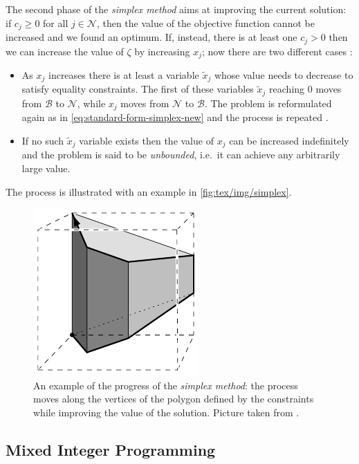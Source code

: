The second phase of the \emph{simplex method} aims at improving the current
solution: if $c_{j} \geq 0$ for all $j \in \mathcal{N} $, then the value of the
objective function cannot be increased and we found an optimum. If, instead,
there is at least one $c_{j}
	> 0$ then we can increase the value of $\zeta$ by increasing $x_{j} $; now
there are two different cases \cite{Vanderbei2008}:
\begin{itemize}
	\item As $x_{j} $ increases there is at least a variable $\tilde{x}_{j} $
	      whose value needs to decrease to satisfy equality constraints. The first
	      of these variables $\tilde{x}_{j} $ reaching $0$ moves from
	      $\mathcal{B} $ to $\mathcal{N} $, while
	      $x_{j} $ moves from $\mathcal{N} $ to $\mathcal{B} $. The problem is reformulated again as in
	      \eqref{eq:standard-form-simplex-new} and the process is repeated
	      \cite{Vanderbei2008}.
	\item If no such $\tilde{x}_{j} $ variable exists then the value of $x_{j}
	      $ can be increased indefinitely and the problem is said to be
	      \emph{unbounded}, i.e.\ it can achieve any arbitrarily large value.
\end{itemize}

The process is illustrated with an example in \autoref{fig:tex/img/simplex}.

\begin{figure}
	\centering
	\includegraphics[width=0.4\linewidth]{tex/img/simplex.png}
	\caption[Simplex method progress]{An example of the progress of the \emph{simplex method}: the
		process moves along the vertices of the polygon defined by the
		constraints while improving the value of the solution. Picture taken
		from \cite{BerndGaertner2006}.}%
	\label{fig:tex/img/simplex}
\end{figure}

\subsection{Mixed Integer Programming}%
\label{sub:mixed_integer_programming}

